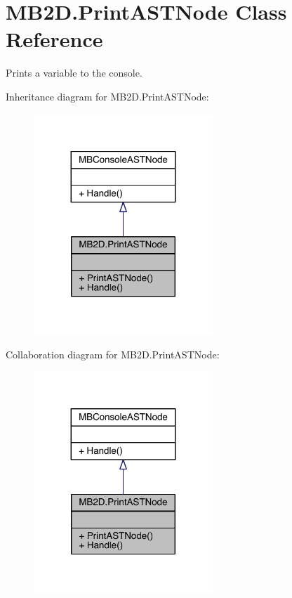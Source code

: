 \hypertarget{class_m_b2_d_1_1_print_a_s_t_node}{}\section{M\+B2\+D.\+Print\+A\+S\+T\+Node Class Reference}
\label{class_m_b2_d_1_1_print_a_s_t_node}


Prints a variable to the console.  




Inheritance diagram for M\+B2\+D.\+Print\+A\+S\+T\+Node\+:
\nopagebreak
\begin{figure}[H]
\begin{center}
\leavevmode
\includegraphics[width=191pt]{class_m_b2_d_1_1_print_a_s_t_node__inherit__graph}
\end{center}
\end{figure}


Collaboration diagram for M\+B2\+D.\+Print\+A\+S\+T\+Node\+:
\nopagebreak
\begin{figure}[H]
\begin{center}
\leavevmode
\includegraphics[width=191pt]{class_m_b2_d_1_1_print_a_s_t_node__coll__graph}
\end{center}
\end{figure}
